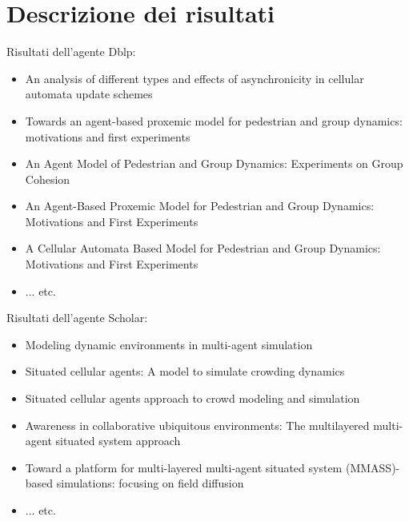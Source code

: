 \documentclass[12pt]{article}
\begin{document}
\section{Descrizione dei risultati}

Risultati dell'agente Dblp:
\begin{itemize}
\item An analysis of different types and effects of asynchronicity in cellular automata update schemes
\item Towards an agent-based proxemic model for pedestrian and group dynamics: motivations and first experiments
\item An Agent Model of Pedestrian and Group Dynamics: Experiments on Group Cohesion
\item An Agent-Based Proxemic Model for Pedestrian and Group Dynamics: Motivations and First Experiments
\item A Cellular Automata Based Model for Pedestrian and Group Dynamics: Motivations and First Experiments
\item ... etc.
\end{itemize}

Risultati dell'agente Scholar:
\begin{itemize}
\item Modeling dynamic environments in multi-agent simulation
\item Situated cellular agents: A model to simulate crowding dynamics
\item Situated cellular agents approach to crowd modeling and simulation
\item Awareness in collaborative ubiquitous environments: The multilayered multi-agent situated system approach
\item Toward a platform for multi-layered multi-agent situated system (MMASS)-based simulations: focusing on field diffusion
\item ... etc.
\end{itemize}
\end{document}
